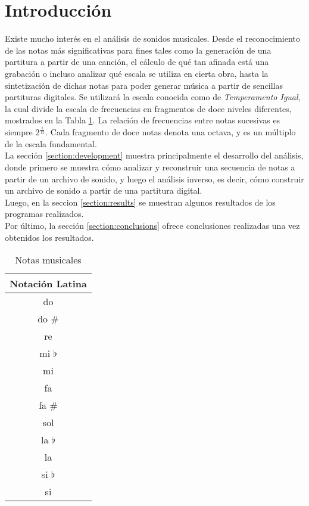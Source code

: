 \documentclass[journal, monochrome]{IEEEtran}
\begin{document}
%
\IEEEpeerreviewmaketitle
\vspace{1cm}

\section{Introducción}

Existe mucho interés en el análisis de sonidos musicales. Desde el reconocimiento de las notas más significativas para fines tales como la generación de una partitura a partir de una canción, el cálculo de qué tan afinada está una grabación o incluso analizar qué escala se utiliza en cierta obra, hasta la sintetización de dichas notas para poder generar música a partir de sencillas partituras digitales. Se utilizará la escala conocida como de \emph{Temperamento Igual}, la cual divide la escala de frecuencias en fragmentos de doce niveles diferentes, mostrados en la Tabla \ref{table:Notas}. La relación de frecuencias entre notas sucesivas es siempre $ 2^\frac{1}{12} $. Cada fragmento de doce notas denota una octava, y es un múltiplo de la escala fundamental. \\

La sección \ref{section:development} muestra principalmente el desarrollo del análisis, donde primero se muestra cómo analizar y reconstruir una secuencia de notas a partir de un archivo de sonido, y luego el análisis inverso, es decir, cómo construir un archivo de sonido a partir de una partitura digital. \\

Luego, en la seccion \ref{section:results} se muestran algunos resultados de los programas realizados. \\

Por último, la sección \ref{section:conclusions} ofrece conclusiones realizadas una vez obtenidos los resultados.

\begin{table}
\centering
\begin{tabular}{|c|}
\hline
Notación Latina \\
\hline
do \\
\hline
do \# \\
\hline
re\\
\hline
mi $\flat$ \\
\hline
mi \\
\hline
fa \\
\hline
fa \# \\
\hline
sol \\
\hline
la $\flat$ \\
\hline
la \\
\hline
si $\flat$ \\
\hline
si \\
\hline
\end{tabular}
\caption{\label{table:Notas} Notas musicales}
\end{table}
\end{document}
